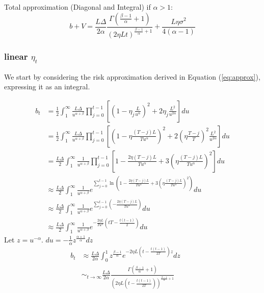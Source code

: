\documentclass{article}
\begin{document}
Total approximation (Diagonal and Integral) if $\alpha>1$:
\[
b + V =  \frac{L\Delta}{2\alpha} \frac{\Gamma(\frac{\beta-1}{\alpha}+1)}{(2\eta L t)^{\frac{\beta-1}{\alpha}+1}} + \frac{L \eta\sigma^2}{4(\alpha-1)} 
\]

\subsubsection{linear $\eta_t$}

We start by considering the risk approximation derived in Equation (\ref{eq:approx}), expressing it as an integral.


\begin{align*}
b_t &= \frac{1}{2} \int_{1}^{\infty} \frac{L\Delta}{u^{\alpha+\beta}} \prod_{j=0}^{t-1} \left[ \left( 1 - \eta_j \frac{L}{u^\alpha} \right)^2 + 2\eta_j \frac{L^2}{u^{2\alpha}} \right] du\\
&= \frac{1}{2} \int_{1}^{\infty} \frac{L\Delta}{u^{\alpha+\beta}} \prod_{j=0}^{t-1} \left[ \left( 1 - \eta\frac{(T-j)L}{T u^\alpha} \right)^2 + 2 \left(\eta \frac{T-j}{T} \right)^2 \frac{L^2}{u^{2\alpha}} \right] du\\
&= \frac{L\Delta}{2} \int_{1}^{\infty} \frac{1}{u^{\alpha+\beta}} \prod_{j=0}^{t-1} \left[ 1 - \frac{2\eta(T-j)L}{T u^\alpha} + 3 \left( \eta\frac{(T-j)L}{T u^\alpha} \right)^2 \right]du\\
&\approx \frac{L\Delta}{2} \int_{1}^{\infty} \frac{1}{u^{\alpha+\beta}}e^{ \sum_{j=0}^{t-1} \ln \left( 1 - \frac{2\eta(T-j)L}{T u^\alpha} + 3 \left( \eta\frac{(T-j)L}{T u^\alpha} \right)^2 \right) }du \\
&\approx \frac{L\Delta}{2} \int_{1}^{\infty} \frac{1}{u^{\alpha+\beta}} e^{ \sum_{j=0}^{t-1} \left( - \frac{2\eta(T-j)L}{T u^\alpha}\right) }du \qquad \\
&\approx \frac{L\Delta}{2} \int_{1}^{\infty} \frac{1}{u^{\alpha+\beta}}e^{ - \frac{2\eta L}{T u^\alpha} \left( tT - \frac{t(t-1)}{2} \right) }  du
\end{align*}
Let $z = u^{-\alpha}$. \quad $du = -\frac{1}{\alpha}z^{\frac{\alpha+1}{\alpha}}dz$
\begin{align*}
b_t&\approx \frac{L\Delta}{2\alpha} \int_{0}^{1} z^{\frac{\beta-1}{\alpha}} e^{ - {2\eta L} \left( t - \frac{t(t-1)}{2T} \right)z }dz  \qquad \\
&\sim_{t \to \infty} \frac{L\Delta}{2\alpha} \frac{\Gamma\left(\frac{\beta-1}{\alpha}+1\right)}{\left( {2\eta L} \left( t - \frac{t(t-1)}{2T} \right)\right)^{\frac{\beta-1}{\alpha}+1}} 
\end{align*}
\end{document}
